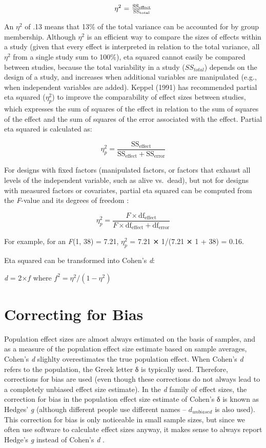 \documentclass[
]{krantz}
\begin{document}
\[\eta^{2}$ = $\frac{\text{SS}_{\text{effect}}}{\text{SS}_{\text{total}}}\]

An \(\eta^2\) of .13 means that 13\% of the total variance can be accounted for by group membership. Although \(\eta^2\) is an efficient way to compare the sizes of effects within a study (given that every effect is interpreted in relation to the total variance, all \(\eta^2\) from a single study sum to 100\%), eta squared cannot easily be compared between studies, because the total variability in a study (\(SS_{total}\)) depends on the design of a study, and increases when additional variables are manipulated (e.g., when independent variables are added). Keppel (1991) has recommended partial eta squared (\(\eta_{p}^{2}\)) to improve the comparability
of effect sizes between studies, which expresses the sum of squares of the effect in relation to the sum of squares of the effect and the sum of squares of the error associated with the effect. Partial eta squared is calculated as:

\[\eta_{p}^{2} = \frac{\text{SS}_{\text{effect}}}{\text{SS}_{\text{effect}} + \text{SS}_{\text{error}}}\]

For designs with fixed factors (manipulated factors, or factors that exhaust all levels of the independent variable, such as alive vs.~dead), but not for designs with measured factors or covariates, partial eta squared can be computed from the \emph{F}-value and its degrees of freedom \citep{cohen_statistical_1988}:

\[\eta_{p}^{2} = \frac{F \times \text{df}_{\text{effect}}}{{F \times \text{df}}_{\text{effect}} + \text{df}_{\text{error}}}\]

For example, for an \emph{F}(1, 38) = 7.21, \(\eta_{p}^{2}\) = 7.21 ⨯ 1/(7.21 ⨯ 1 +
38) = 0.16.

Eta squared can be transformed into Cohen's \emph{d}:

\emph{d} = 2\(\times f\) where \(f^{2} = \eta^{2}/(1 - \eta^{2})\)

\hypertarget{correcting-for-bias}{%
\section{Correcting for Bias}\label{correcting-for-bias}}

Population effect sizes are almost always estimated on the basis of samples, and as a measure of the population effect size estimate based on sample averages, Cohen's \emph{d} slighlty overestimates the true population effect. When Cohen's \emph{d} refers to the population, the Greek letter δ is typically used. Therefore, corrections for bias are used (even though these corrections do not always lead to a completely unbiased effect size estimate). In the \emph{d} family of effect sizes, the correction for bias in the population effect size estimate of Cohen's δ is known as Hedges' \emph{g} (although different people use different names -- \(d_{unbiased}\) is also used). This correction for bias is only noticeable in small sample sizes, but since we often use software to calculate effect sizes anyway, it makes sense to always report Hedge's \emph{g} instead of Cohen's \emph{d} \citep{thompson_effect_2007}.
\end{document}
